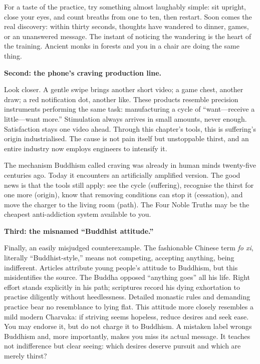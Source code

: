 For a taste of the practice, try something almost laughably simple: sit upright, close your eyes, and count breaths from one to ten, then restart. Soon comes the real discovery: within thirty seconds, thoughts have wandered to dinner, games, or an unanswered message. The instant of noticing the wandering is the heart of the training. Ancient monks in forests and you in a chair are doing the same thing.

\textbf{Second: the phone's craving production line.}

Look closer. A gentle swipe brings another short video; a game chest, another draw; a red notification dot, another like. These products resemble precision instruments performing the same task: manufacturing a cycle of ``want---receive a little---want more.'' Stimulation always arrives in small amounts, never enough. Satisfaction stays one video ahead. Through this chapter's tools, this is suffering's origin industrialised. The cause is not pain itself but unstoppable thirst, and an entire industry now employs engineers to intensify it.

The mechanism Buddhism called craving was already in human minds twenty-five centuries ago. Today it encounters an artificially amplified version. The good news is that the tools still apply: see the cycle (suffering), recognise the thirst for one more (origin), know that removing conditions can stop it (cessation), and move the charger to the living room (path). The Four Noble Truths may be the cheapest anti-addiction system available to you.

\textbf{Third: the misnamed ``Buddhist attitude.''}

Finally, an easily misjudged counterexample. The fashionable Chinese term \textit{fo xi}, literally ``Buddhist-style,'' means not competing, accepting anything, being indifferent. Articles attribute young people's attitude to Buddhism, but this misidentifies the source. The Buddha opposed ``anything goes'' all his life. Right effort stands explicitly in his path; scriptures record his dying exhortation to practise diligently without heedlessness. Detailed monastic rules and demanding practice bear no resemblance to lying flat. This attitude more closely resembles a mild modern Charvaka: if striving seems hopeless, reduce desires and seek ease. You may endorse it, but do not charge it to Buddhism. A mistaken label wrongs Buddhism and, more importantly, makes you miss its actual message. It teaches not indifference but clear seeing: which desires deserve pursuit and which are merely thirst?

